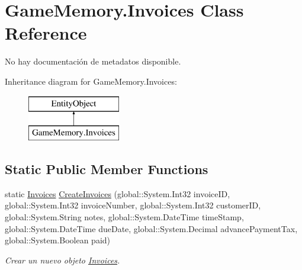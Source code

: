 \hypertarget{class_game_memory_1_1_invoices}{\section{Game\-Memory.\-Invoices Class Reference}
\label{class_game_memory_1_1_invoices}
}


No hay documentación de metadatos disponible.  


Inheritance diagram for Game\-Memory.\-Invoices\-:\begin{figure}[H]
\begin{center}
\leavevmode
\includegraphics[height=2.000000cm]{class_game_memory_1_1_invoices}
\end{center}
\end{figure}
\subsection*{Static Public Member Functions}
\begin{DoxyCompactItemize}
\item 
static \hyperlink{class_game_memory_1_1_invoices}{Invoices} \hyperlink{class_game_memory_1_1_invoices_a386fad50c526991afab04b32057e18fe}{Create\-Invoices} (global\-::\-System.\-Int32 invoice\-I\-D, global\-::\-System.\-Int32 invoice\-Number, global\-::\-System.\-Int32 customer\-I\-D, global\-::\-System.\-String notes, global\-::\-System.\-Date\-Time time\-Stamp, global\-::\-System.\-Date\-Time due\-Date, global\-::\-System.\-Decimal advance\-Payment\-Tax, global\-::\-System.\-Boolean paid)
\begin{DoxyCompactList}\small\item\em Crear un nuevo objeto \hyperlink{class_game_memory_1_1_invoices}{Invoices}. \end{DoxyCompactList}\end{DoxyCompactItemize}
